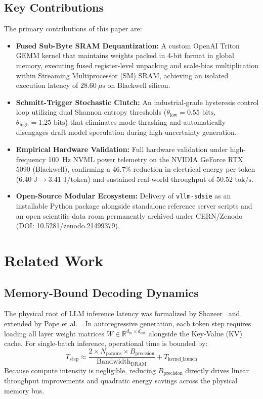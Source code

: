 \documentclass[10pt,journal,compsoc,twocolumn]{IEEEtran}
\begin{document}
\subsection{Key Contributions}
The primary contributions of this paper are:
\begin{itemize}
    \item \textbf{Fused Sub-Byte SRAM Dequantization:} A custom OpenAI Triton GEMM kernel that maintains weights packed in 4-bit format in global memory, executing fused register-level unpacking and scale-bias multiplication within Streaming Multiprocessor (SM) SRAM, achieving an isolated execution latency of $28.60\ \mu\text{s}$ on Blackwell silicon.
    \item \textbf{Schmitt-Trigger Stochastic Clutch:} An industrial-grade hysteresis control loop utilizing dual Shannon entropy thresholds ($\theta_{\text{low}} = 0.55\text{ bits}$, $\theta_{\text{high}} = 1.25\text{ bits}$) that eliminates mode thrashing and automatically disengages draft model speculation during high-uncertainty generation.
    \item \textbf{Empirical Hardware Validation:} Full hardware validation under high-frequency 100~Hz NVML power telemetry on the NVIDIA GeForce RTX 5090 (Blackwell), confirming a $46.7\%$ reduction in electrical energy per token ($6.40\text{ J} \to 3.41\text{ J/token}$) and sustained real-world throughput of $50.52\text{ tok/s}$.
    \item \textbf{Open-Source Modular Ecosystem:} Delivery of \texttt{vllm-sdsie} as an installable Python package alongside standalone reference server scripts and an open scientific data room permanently archived under CERN/Zenodo (DOI: 10.5281/zenodo.21499379).
\end{itemize}

\section{Related Work}

\subsection{Memory-Bound Decoding Dynamics}
The physical root of LLM inference latency was formalized by Shazeer~\cite{shazeer2019fast} and extended by Pope et al.~\cite{pope2023efficiently}. In autoregressive generation, each token step requires loading all layer weight matrices $W \in \mathbb{R}^{d_{\text{in}} \times d_{\text{out}}}$ alongside the Key-Value (KV) cache. For single-batch inference, operational time is bounded by:
\begin{equation}
T_{\text{step}} \approx \frac{2 \times N_{\text{params}} \times B_{\text{precision}}}{\text{Bandwidth}_{\text{DRAM}}} + T_{\text{kernel\_launch}}
\end{equation}
Because compute intensity is negligible, reducing $B_{\text{precision}}$ directly drives linear throughput improvements and quadratic energy savings across the physical memory bus.
\end{document}
